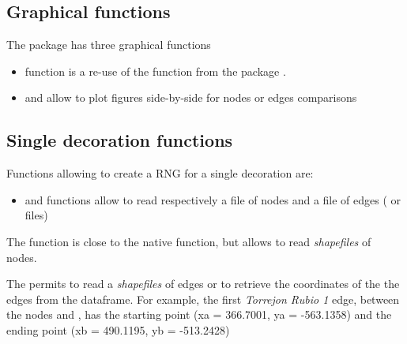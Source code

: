 \documentclass[article]{jss}\usepackage{knitr}
\begin{document}
\subsection{Graphical functions} \label{sec:functions_gr}

The  package has three graphical functions
\begin{itemize}
\setlength\itemsep{.1em}
\item {} function is a re-use of the  function from the  package \citep{Snow20}.
\item {} and  allow to plot figures side-by-side for nodes or edges comparisons
\end{itemize}

\subsection{Single decoration functions} \label{sec:functions_one}

Functions allowing to create a RNG for a single decoration are:

\begin{itemize}
\setlength\itemsep{.1em}
  \item {} and  functions allow to read respectively a file of nodes and a file of edges ( or  files)
\end{itemize}

The  function is close to the native   function, but allows to read \emph{shapefiles} of nodes.

The  permits to read a \emph{shapefiles} of edges or to retrieve the coordinates of the the edges from the  dataframe. For example, the first \emph{Torrejon Rubio 1} edge, between the nodes  and , has the starting point (xa = 366.7001, ya = -563.1358) and the ending point (xb = 490.1195, yb = -513.2428)
\end{document}
